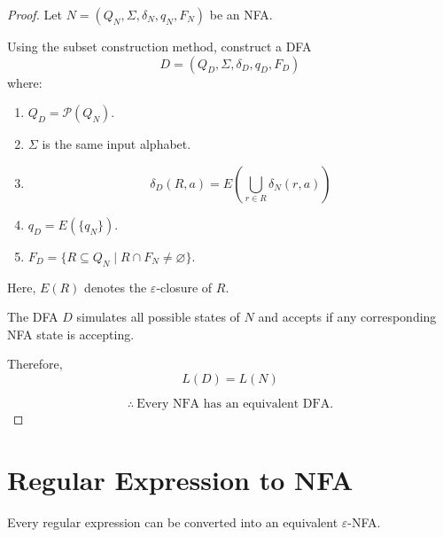 \documentclass[11pt]{scrreprt}
\begin{document}
\begin{proof}
    Let $N = (Q_N, \Sigma, \delta_N, q_N, F_N)$ be an NFA.

    Using the subset construction method, construct a DFA
    \[
        D = (Q_D, \Sigma, \delta_D, q_D, F_D)
    \]
    where:

    \begin{enumerate}
        \item $Q_D = \mathcal{P}(Q_N)$.

        \item $\Sigma$ is the same input alphabet.

        \item
        \[
            \delta_D(R,a)
            =
            E\left(
                \bigcup_{r \in R} \delta_N(r,a)
            \right)
        \]

        \item $q_D = E(\{q_N\})$.

        \item $F_D = \{R \subseteq Q_N \mid R \cap F_N \neq \varnothing\}$.
    \end{enumerate}

    Here, $E(R)$ denotes the $\varepsilon$-closure of $R$.

    The DFA $D$ simulates all possible states of $N$ and
    accepts if any corresponding NFA state is accepting.

    Therefore,
    \[
        \boxed{L(D) = L(N)}
    \]

    \[
        \therefore\ \text{Every NFA has an equivalent DFA.}
    \]
\end{proof}

\section{Regular Expression to NFA}
\begin{lemma*}
    Every regular expression can be converted into an equivalent
    $\varepsilon$-NFA.
\end{lemma*}
\end{document}
